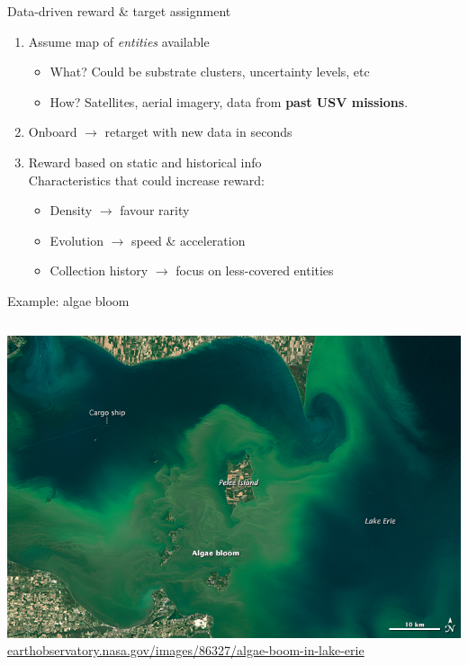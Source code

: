 \documentclass[9pt,xcolor=table]{beamer}
\begin{document}
\begin{frame}{Data-driven reward \& target assignment}
    \begin{enumerate}
        \item Assume map of \textit{entities} available
        \begin{itemize}
            \item What? Could be substrate clusters, uncertainty levels, etc
            \item How? Satellites, aerial imagery, data from \textbf{past USV missions}.
        \end{itemize}
        \item Onboard $\rightarrow$ retarget with new data in seconds
        \item Reward based on static and historical info \\
        Characteristics that could increase reward: \\
        \begin{itemize}
            \item Density $\rightarrow$ favour rarity
            \item Evolution $\rightarrow$ speed \& acceleration
            \item Collection history $\rightarrow$ focus on less-covered entities
        \end{itemize}
    \end{enumerate}
    \vfill
    \begin{block}{Example: algae bloom}
        \begin{columns}
            \begin{column}{0.6\textwidth}
                \includegraphics[width=\textwidth,trim={0cm 2cm 2cm 2cm},clip]{img/algae_bloom.jpg} \\
                {\tiny \url{earthobservatory.nasa.gov/images/86327/algae-boom-in-lake-erie}}
                

\end{column}
\end{columns}
\end{block}
\end{frame}
\end{document}
